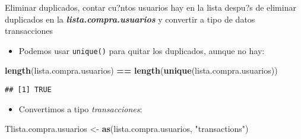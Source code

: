 \documentclass[
  ignorenonframetext,
]{beamer}
\newenvironment{Shaded}{\begin{snugshade}}{\end{snugshade}}
\newcommand{\KeywordTok}[1]{\textcolor[rgb]{0.13,0.29,0.53}{\textbf{#1}}}
\newcommand{\NormalTok}[1]{#1}
\newcommand{\OperatorTok}[1]{\textcolor[rgb]{0.81,0.36,0.00}{\textbf{#1}}}
\newcommand{\StringTok}[1]{\textcolor[rgb]{0.31,0.60,0.02}{#1}}
\providecommand{\tightlist}{%
  \setlength{\itemsep}{0pt}\setlength{\parskip}{0pt}}
\begin{document}
\begin{frame}[fragile]{Eliminar duplicados, contar cu?ntos usuarios hay
en la lista despu?s de eliminar duplicados en la
\textbf{\emph{lista.compra.usuarios}} y convertir a tipo de datos
transacciones}
\protect\hypertarget{eliminar-duplicados-contar-cuntos-usuarios-hay-en-la-lista-despus-de-eliminar-duplicados-en-la-lista.compra.usuarios-y-convertir-a-tipo-de-datos-transacciones}{}

\begin{itemize}
\tightlist
\item
  Podemos usar \texttt{unique()} para quitar los duplicados, aunque no
  hay:
\end{itemize}

\begin{Shaded}
\begin{Highlighting}[]
\KeywordTok{length}\NormalTok{(lista.compra.usuarios) }\OperatorTok{==}\StringTok{ }\KeywordTok{length}\NormalTok{(}\KeywordTok{unique}\NormalTok{(lista.compra.usuarios))}
\end{Highlighting}
\end{Shaded}

\begin{verbatim}
## [1] TRUE
\end{verbatim}

\begin{itemize}
\tightlist
\item
  Convertimos a tipo \emph{transacciones}:
\end{itemize}

\begin{Shaded}
\begin{Highlighting}[]
\NormalTok{Tlista.compra.usuarios <-}\StringTok{ }\KeywordTok{as}\NormalTok{(lista.compra.usuarios, }\StringTok{"transactions"}\NormalTok{)}
\end{Highlighting}
\end{Shaded}

\end{frame}
\end{document}
